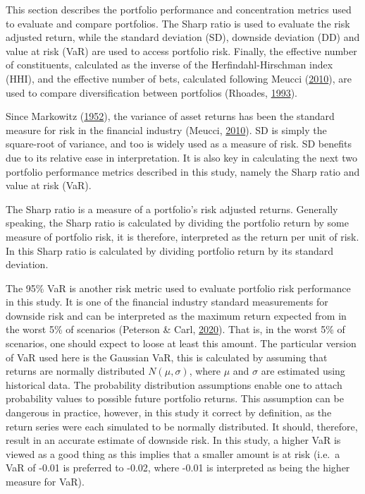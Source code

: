 \documentclass[11pt,preprint, authoryear]{elsarticle}
\numberwithin{equation}{section}
\numberwithin{figure}{section}
\numberwithin{table}{section}
\begin{document}
This section describes the portfolio performance and concentration
metrics used to evaluate and compare portfolios. The Sharp ratio is used
to evaluate the risk adjusted return, while the standard deviation (SD),
downside deviation (DD) and value at risk (VaR) are used to access
portfolio risk. Finally, the effective number of constituents,
calculated as the inverse of the Herfindahl-Hirschman index (HHI), and
the effective number of bets, calculated following Meucci
(\protect\hyperlink{ref-meucci2010}{2010}), are used to compare
diversification between portfolios (Rhoades,
\protect\hyperlink{ref-rhoades1993}{1993}).

Since Markowitz (\protect\hyperlink{ref-markowitz}{1952}), the variance
of asset returns has been the standard measure for risk in the financial
industry (Meucci, \protect\hyperlink{ref-meucci2010}{2010}). SD is
simply the square-root of variance, and too is widely used as a measure
of risk. SD benefits due to its relative ease in interpretation. It is
also key in calculating the next two portfolio performance metrics
described in this study, namely the Sharp ratio and value at risk (VaR).

The Sharp ratio is a measure of a portfolio's risk adjusted returns.
Generally speaking, the Sharp ratio is calculated by dividing the
portfolio return by some measure of portfolio risk, it is therefore,
interpreted as the return per unit of risk. In this Sharp ratio is
calculated by dividing portfolio return by its standard deviation.

The 95\% VaR is another risk metric used to evaluate portfolio risk
performance in this study. It is one of the financial industry standard
measurements for downside risk and can be interpreted as the maximum
return expected from in the worst 5\% of scenarios (Peterson \& Carl,
\protect\hyperlink{ref-PerformanceAnalytics}{2020}). That is, in the
worst 5\% of scenarios, one should expect to loose at least this amount.
The particular version of VaR used here is the Gaussian VaR, this is
calculated by assuming that returns are normally distributed
\(N(\mu,\sigma)\), where \(\mu\) and \(\sigma\) are estimated using
historical data. The probability distribution assumptions enable one to
attach probability values to possible future portfolio returns. This
assumption can be dangerous in practice, however, in this study it
correct by definition, as the return series were each simulated to be
normally distributed. It should, therefore, result in an accurate
estimate of downside risk. In this study, a higher VaR is viewed as a
good thing as this implies that a smaller amount is at risk (i.e.~a VaR
of -0.01 is preferred to -0.02, where -0.01 is interpreted as being the
higher measure for VaR).
\end{document}
